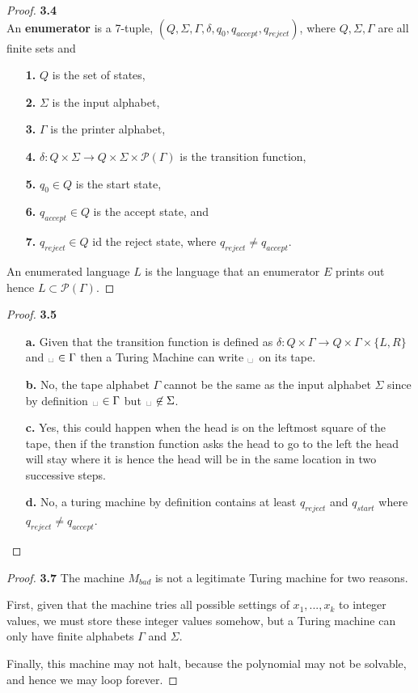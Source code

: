 \documentclass[11pt]{article}
\newcommand{\esp}{\text{\textvisiblespace}\hspace{0.1em}}
\theoremstyle{definition}
\begin{document}
\cleardoublepage
\begin{proof}{\textbf{3.4}}\\
An \textbf{enumerator} is a 7-tuple,
$(Q, \Sigma ,\Gamma,\delta, q_0,q_{accept}, q_{reject})$, where
$Q, \Sigma, \Gamma$ are all finite sets and
\begin{itemize}
\item [\textbf{1.}] $Q$ is the set of states,
\item [\textbf{2.}] $\Sigma$ is the input alphabet,
\item [\textbf{3.}] $\Gamma$ is the printer alphabet,
\item [\textbf{4.}] $\delta: Q \times \Sigma \to Q \times \Sigma
\times \mathcal{P}(\Gamma)$ is the transition function,
\item [\textbf{5.}] $q_0 \in Q$ is the start state,
\item [\textbf{6.}] $q_{accept} \in Q$ is the accept state, and
\item [\textbf{7.}] $q_{reject} \in Q$ id the reject state, where
$q_{reject} \neq q_{accept}$.
\end{itemize}
An enumerated language $L$ is the language that an enumerator $E$ prints out
hence $L \subset \mathcal{P}(\Gamma)$.
\end{proof}

\cleardoublepage
\begin{proof}{\textbf{3.5}}
\begin{itemize}
\item [\textbf{a.}] Given that the transition function is defined as
$\delta: Q \times \Gamma \to Q \times \Gamma \times \{L,R\}$ and 
$\esp \in \Gamma$ then a Turing Machine can write $\esp$ on its tape.

\item [\textbf{b.}] No, the tape alphabet $\Gamma$ cannot be the same as the
input alphabet $\Sigma$ since by definition $\esp \in \Gamma$ but
$\esp \not\in \Sigma$.

\item [\textbf{c.}] Yes, this could happen when the head is on the leftmost
square of the tape, then if the transtion function asks the head to go to the
left the head will stay where it is hence the head will be in the same location
in two successive steps.

\item [\textbf{d.}] No, a turing machine by definition contains at least
$q_{reject}$ and $q_{start}$ where $q_{reject} \neq q_{accept}$.
\end{itemize}
\end{proof}
\begin{proof}{\textbf{3.7}}
The machine $M_{bad}$ is not a legitimate Turing machine for two reasons.

First, given that the machine tries all possible settings of $x_1, ..., x_k$
to integer values, we must store these integer values somehow, but a Turing
machine can only have finite alphabets $\Gamma$ and $\Sigma$.

Finally, this machine may not halt, because the polynomial may not be solvable,
and hence we may loop forever.
\end{proof}
\end{document}
